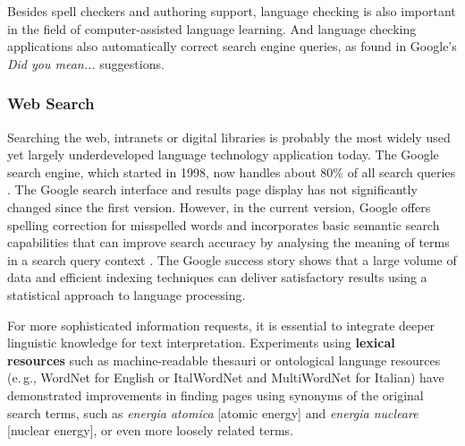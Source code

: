 \begin{multicols}{2}
Besides spell checkers and authoring support, language checking is also important in the field of computer-assisted language learning. And language checking applications also automatically correct search engine queries, as found in Google's \emph{Did you mean...} suggestions.

\subsubsection{Web Search}

Searching the web, intranets or digital libraries is probably the most widely used yet largely underdeveloped language technology application today. The Google search engine, which started in 1998, now handles about 80\% of all search queries \cite{spi1}. The Google search interface and results page display has not significantly changed since the first version. However, in the current version, Google offers spelling correction for misspelled words and incorporates basic semantic search capabilities that can improve search accuracy by analysing the meaning of terms in a search query context \cite{pc1}. The Google success story shows that a large volume of data and efficient indexing techniques can deliver satisfactory results using a statistical approach to language processing. 

For more sophisticated information requests, it is essential to integrate deeper linguistic knowledge for text interpretation. Experiments using \textbf{lexical resources} such as machine-readable thesauri or ontological language resources (e.\,g., WordNet for English or ItalWordNet and MultiWordNet for Italian) have demonstrated improvements in finding pages using synonyms of the original search terms, such as \emph{energia atomica} [atomic energy] and \emph{energia nucleare} [nuclear energy], or even more loosely related terms.





\end{multicols}

